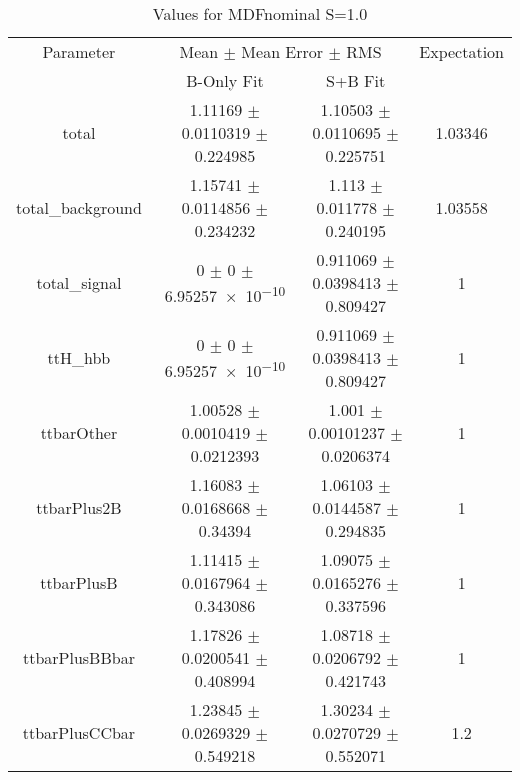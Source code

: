 \begin{table}
\centering
\caption{Values for MDFnominal S=1.0}
\begin{tabular}{cccc}
\toprule
Parameter & \multicolumn{2}{c}{Mean $\pm$ Mean Error $\pm$ RMS} & Expectation\\
 & B-Only Fit & S+B Fit & \\
\midrule
total & \num{1.11169} $\pm$ \num{0.0110319} $\pm$ \num{0.224985} & \num{1.10503} $\pm$ \num{0.0110695} $\pm$ \num{0.225751} & \num{1.03346}\\
total\_background & \num{1.15741} $\pm$ \num{0.0114856} $\pm$ \num{0.234232} & \num{1.113} $\pm$ \num{0.011778} $\pm$ \num{0.240195} & \num{1.03558}\\
total\_signal & \num{0} $\pm$ \num{0} $\pm$ \num{6.95257e-10} & \num{0.911069} $\pm$ \num{0.0398413} $\pm$ \num{0.809427} & \num{1}\\
ttH\_hbb & \num{0} $\pm$ \num{0} $\pm$ \num{6.95257e-10} & \num{0.911069} $\pm$ \num{0.0398413} $\pm$ \num{0.809427} & \num{1}\\
ttbarOther & \num{1.00528} $\pm$ \num{0.0010419} $\pm$ \num{0.0212393} & \num{1.001} $\pm$ \num{0.00101237} $\pm$ \num{0.0206374} & \num{1}\\
ttbarPlus2B & \num{1.16083} $\pm$ \num{0.0168668} $\pm$ \num{0.34394} & \num{1.06103} $\pm$ \num{0.0144587} $\pm$ \num{0.294835} & \num{1}\\
ttbarPlusB & \num{1.11415} $\pm$ \num{0.0167964} $\pm$ \num{0.343086} & \num{1.09075} $\pm$ \num{0.0165276} $\pm$ \num{0.337596} & \num{1}\\
ttbarPlusBBbar & \num{1.17826} $\pm$ \num{0.0200541} $\pm$ \num{0.408994} & \num{1.08718} $\pm$ \num{0.0206792} $\pm$ \num{0.421743} & \num{1}\\
ttbarPlusCCbar & \num{1.23845} $\pm$ \num{0.0269329} $\pm$ \num{0.549218} & \num{1.30234} $\pm$ \num{0.0270729} $\pm$ \num{0.552071} & \num{1.2}\\
\bottomrule
\end{tabular}
\end{table}